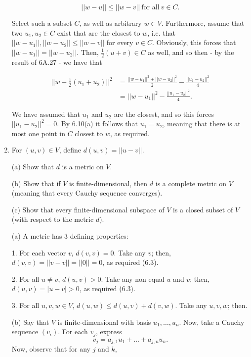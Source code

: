 \documentclass{book}
\begin{document}
\begin{enumerate}
\begin{equation*}
    ||w-u|| \leq ||w-v|| \ \textrm{for all} \ v \in C.
\end{equation*}

Select such a subset \(C\), as well as arbitrary \(w \in V\).  Furthermore, assume that two \(u_1,u_2 \in C\) exist that are the closest to \(w\), i.e. that \(||w-u_1||, ||w-u_2|| \leq ||w-v||\) for every \(v \in C\).  Obviously, this forces that \(||w-u_1||=||w-u_2||\).  Then, \(\frac{1}{2}(u+v) \in C\) as well, and so then - by the result of 6A.27 - we have that

\begin{equation*}
    \begin{split}
        ||w - \frac{1}{2}(u_1+u_2)||^2 &= \frac{||w-u_1||^2+||w-u_2||^2}{2}-\frac{||u_1-u_2||^2}{4} \\
        &= ||w-u_1||^2 - \frac{||u_1-u_2||^2}{4}.
    \end{split}
\end{equation*}

We have assumed that \(u_1\) and \(u_2\) are the closest, and so this forces \(||u_1 - u_2||^2 = 0\).  By 6.10(a) it follows that \(u_1 = u_2\), meaning that there is at most one point in \(C\) closest to \(w\), as required.

\item For \((u,v) \in V\), define \(d(u,v) = ||u-v||\).

(a) Show that \(d\) is a metric on \(V\).

(b) Show that if \(V\) is finite-dimensional, then \(d\) is a complete metric on \(V\) (meaning that every Cauchy sequence converges).

(c) Show that every finite-dimensional subspace of \(V\) is a closed subset of \(V\) (with respect to the metric \(d\)).

(a) A metric has 3 defining properties:

1.  For each vector \(v\), \(d(v,v)=0\).  Take any \(v\); then, \(d(v,v)=||v-v||=||0||=0\), as required (6.3).

2.  For all \(u \neq v\), \(d(u,v)>0\).  Take any non-equal \(u\) and \(v\); then, \(d(u,v)=|u-v|>0\), as required (6.3).

3.  For all \(u,v,w \in V\), \(d(u,w) \leq d(u,v)+d(v,w)\).  Take any \(u,v,w\); then.

(b) Say that \(V\) is finite-dimensional with basis \(u_1,\dots,u_n\).  Now, take a Cauchy sequence \((v_i)\).  For each \(v_j\), express \[v_j=a_{j,1}u_1+\dots+a_{j,n}u_n.\] Now, observe that for any \(j\) and \(k\),


\end{enumerate}
\end{document}
